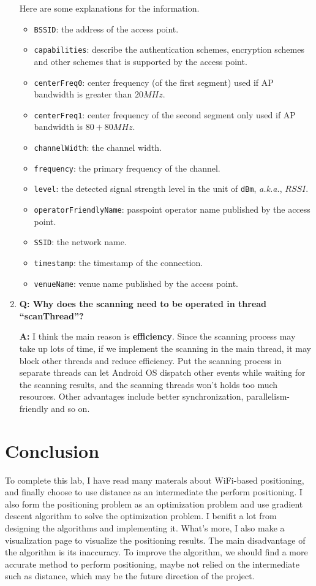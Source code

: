 \documentclass[12pt, a4paper]{article}
\theoremstyle{definition}
\begin{document}
\begin{enumerate}
Here are some explanations for the information.

\begin{itemize}
\item \texttt{BSSID}: the address of the access point.
\item \texttt{capabilities}: describe the authentication schemes, encryption schemes and other schemes that is supported by the access point.
\item \texttt{centerFreq0}: center frequency (of the first segment) used if AP bandwidth is greater than $20 MHz$.
\item \texttt{centerFreq1}: center frequency of the second segment only used if AP bandwidth is $80 + 80 MHz$.
\item \texttt{channelWidth}: the channel width.
\item \texttt{frequency}: the primary frequency of the channel.
\item \texttt{level}: the detected signal strength level in the unit of \texttt{dBm}, \textit{a.k.a.}, $RSSI$.
\item \texttt{operatorFriendlyName}: passpoint operator name published by the access point.
\item \texttt{SSID}: the network name.
\item \texttt{timestamp}: the timestamp of the connection.
\item \texttt{venueName}: venue name published by the access point.
\end{itemize}

\item \textbf{Q: Why does the scanning need to be operated in thread ``scanThread''?}

\textbf{A: } I think the main reason is \textbf{efficiency}. Since the scanning process may take up lots of time, if we implement the scanning in the main thread, it may block other threads and reduce efficiency. Put the scanning process in separate threads can let Android OS dispatch other events while waiting for the scanning results, and the scanning threads won't holds too much resources. Other advantages include better synchronization, parallelism-friendly and so on.
\end{enumerate}

\section{Conclusion}
To complete this lab, I have read many materals about WiFi-based positioning, and finally choose to use distance as an intermediate the perform positioning. I also form the positioning problem as an optimization problem and use gradient descent algorithm to solve the optimization problem. I benifit a lot from designing the algorithms and implementing it. What's more, I also make a visualization page to visualize the positioning results. The main disadvantage of the algorithm is its inaccuracy. To improve the algorithm, we should find a more accurate method to perform positioning, maybe not relied on the intermediate such as distance, which may be the future direction of the project.
\end{document}
